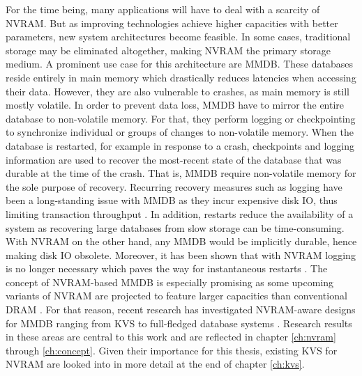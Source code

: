 For the time being, many applications will have to deal with a scarcity of
\ac{NVRAM}. But as improving technologies achieve higher capacities with better
parameters, new system architectures become feasible. In some cases, traditional
storage may be eliminated altogether, making \ac{NVRAM} the primary storage
medium. A prominent use case for this architecture are \ac{MMDB}. These
databases reside entirely in main memory which drastically reduces latencies
when accessing their data. However, they are also vulnerable to crashes, as main
memory is still mostly volatile. In order to prevent data loss, \ac{MMDB} have
to mirror the entire database to non-volatile memory. For that, they perform
logging or checkpointing to synchronize individual or groups of changes to
non-volatile memory. When the database is restarted, for example in response to
a crash, checkpoints and logging information are used to recover the most-recent
state of the database that was durable at the time of the crash. That is,
\ac{MMDB} require non-volatile memory for the sole purpose of recovery.
Recurring recovery measures such as logging have been a long-standing issue with
\ac{MMDB} as they incur expensive disk \ac{IO}, thus limiting transaction
throughput \cite{eich1986main, molina1992main, wust2012efficient,
malviya2014rethinking}. In addition, restarts reduce the availability of a
system as recovering large databases from slow storage can be time-consuming.
With \ac{NVRAM} on the other hand, any \ac{MMDB} would be implicitly durable,
hence making disk \ac{IO} obsolete. Moreover, it has been shown that with
\ac{NVRAM} logging is no longer necessary which paves the way for instantaneous
restarts \cite{oukid2015instant}. The concept of \ac{NVRAM}-based \ac{MMDB} is
especially promising as some upcoming variants of \ac{NVRAM} are projected to
feature larger capacities than conventional \ac{DRAM} \cite{lee2009architecting,
zilberberg2013phase, dulloor2014system}. For that reason, recent research has
investigated \ac{NVRAM}-aware designs for \ac{MMDB} ranging from \ac{KVS}
\cite{bailey2013exploring, zhou2016nvht, wu2016nvmcached} to full-fledged
database systems \cite{oukid2015instant, schwalb2016hyrise, andrei2017sap}.
Research results in these areas are central to this work and are reflected in
chapter \ref{ch:nvram} through \ref{ch:concept}. Given their importance for this
thesis, existing \ac{KVS} for \ac{NVRAM} are looked into in more detail at the
end of chapter \ref{ch:kvs}.

